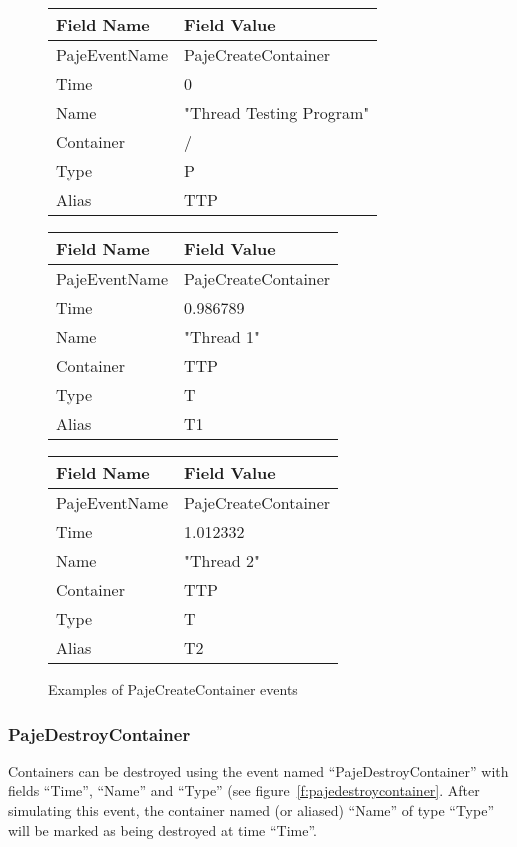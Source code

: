 \begin{figure}[htbp]
\begin{center}
\begin{tabular}{|LL|}
\hline
\textbf{Field Name} & \textbf{Field Value} \\
\hline
PajeEventName & PajeCreateContainer \\
Time          & 0\\
Name          & "Thread Testing Program"\\
Container     & /\\
Type          & P\\
Alias         & TTP\\
\hline
\end{tabular}%

\begin{tabular}{|LL|}
\hline
\textbf{Field Name} & \textbf{Field Value} \\
\hline
PajeEventName & PajeCreateContainer \\
Time          & 0.986789\\
Name          & "Thread 1"\\
Container     & TTP\\
Type          & T\\
Alias         & T1\\
\hline
\end{tabular}%
\quad%
\begin{tabular}{|LL|}
\hline
\textbf{Field Name} & \textbf{Field Value} \\
\hline
PajeEventName & PajeCreateContainer \\
Time          & 1.012332\\
Name          & "Thread 2"\\
Container     & TTP\\
Type          & T\\
Alias         & T2\\
\hline
\end{tabular}%
\end{center}%
\caption{Examples of PajeCreateContainer events}
\label{f:createcontainerexample}
\end{figure}


\subsubsection*{PajeDestroyContainer}

Containers can be destroyed using the event named
``PajeDestroyContainer'' with fields ``Time'', ``Name'' and ``Type'' (see
figure~\ref{f:pajedestroycontainer}.
After simulating this event, the container named (or aliased) ``Name'' of type
``Type'' will be marked as being destroyed at time ``Time''.


